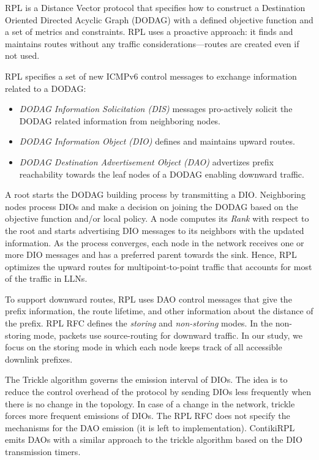 \documentclass[conference,10pt,a4paper]{IEEEtran}
\begin{document}
RPL is a Distance Vector protocol that specifies how to construct a
Destination Oriented Directed Acyclic Graph (DODAG) with a defined objective
function and a set of metrics and constraints. RPL uses a proactive approach:
it finds and maintains routes without any traffic considerations---routes are
created 
even if not used.


RPL  specifies a set of new ICMPv6 control messages to exchange information related to a DODAG:
\begin{itemize}
\item{\textit{DODAG Information Solicitation (DIS)} messages pro-actively
    solicit the DODAG related information from neighboring nodes.}
\item{\textit{DODAG Information Object (DIO)}} defines and maintains upward
  routes.
\item{\textit{DODAG Destination Advertisement Object (DAO)} advertizes prefix
    reachability towards the leaf nodes of a DODAG enabling downward traffic.}
\end{itemize} 
A root starts the DODAG building process by transmitting a DIO. Neighboring
nodes process DIOs and make a decision on joining the DODAG based on the
objective function and/or local policy. A node computes its \textit{Rank} with
respect to the root and starts advertising DIO messages to its neighbors with
the updated information. As the process converges, each node in the network receives
one or more DIO messages and has a preferred parent  towards the
sink. Hence, RPL optimizes the upward routes for multipoint-to-point traffic
that accounts for most of the traffic in LLNs.

To support downward routes, RPL uses DAO control messages that give the prefix
information, the route lifetime, and other information about the distance of the
prefix. RPL RFC \cite{rpl-draft} defines the \emph{storing} and
\emph{non-storing} modes. In the non-storing mode, packets use source-routing
for downward traffic. 
In our study, we focus on the storing mode in which each node keeps track of all
accessible downlink  prefixes. 




The Trickle algorithm \cite{trickle-rfc} governs the emission interval of DIOs. 
The idea is to reduce the control overhead of the protocol by sending DIOs less
frequently when there is no change in the topology. In case of a change in the
network, trickle forces more frequent emissions of DIOs. 
The RPL RFC \cite{rpl-draft} does not specify the mechanisms
for the DAO emission (it is left to implementation). ContikiRPL emits DAOs
with a similar approach to the trickle algorithm based on the DIO
transmission timers.
\end{document}
